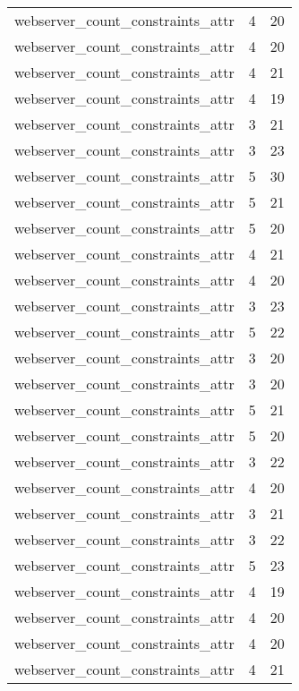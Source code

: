 \begin{table}
\begin{tabular}{lrr}
webserver\_count\_constraints\_attr &         4 &        20 \\
webserver\_count\_constraints\_attr &         4 &        20 \\
webserver\_count\_constraints\_attr &         4 &        21 \\
webserver\_count\_constraints\_attr &         4 &        19 \\
webserver\_count\_constraints\_attr &         3 &        21 \\
webserver\_count\_constraints\_attr &         3 &        23 \\
webserver\_count\_constraints\_attr &         5 &        30 \\
webserver\_count\_constraints\_attr &         5 &        21 \\
webserver\_count\_constraints\_attr &         5 &        20 \\
webserver\_count\_constraints\_attr &         4 &        21 \\
webserver\_count\_constraints\_attr &         4 &        20 \\
webserver\_count\_constraints\_attr &         3 &        23 \\
webserver\_count\_constraints\_attr &         5 &        22 \\
webserver\_count\_constraints\_attr &         3 &        20 \\
webserver\_count\_constraints\_attr &         3 &        20 \\
webserver\_count\_constraints\_attr &         5 &        21 \\
webserver\_count\_constraints\_attr &         5 &        20 \\
webserver\_count\_constraints\_attr &         3 &        22 \\
webserver\_count\_constraints\_attr &         4 &        20 \\
webserver\_count\_constraints\_attr &         3 &        21 \\
webserver\_count\_constraints\_attr &         3 &        22 \\
webserver\_count\_constraints\_attr &         5 &        23 \\
webserver\_count\_constraints\_attr &         4 &        19 \\
webserver\_count\_constraints\_attr &         4 &        20 \\
webserver\_count\_constraints\_attr &         4 &        20 \\
webserver\_count\_constraints\_attr &         4 &        21 \\
\bottomrule
\end{tabular}
\end{table}
